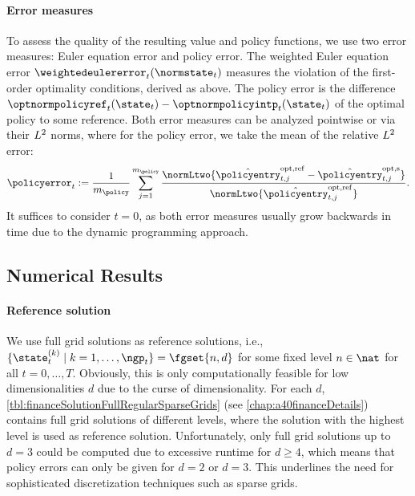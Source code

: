 \paragraph{Error measures}

To assess the quality of the resulting value and policy functions,
we use two error measures:
Euler equation error and policy error.
The weighted Euler equation error $\weightedeulererror_t(\normstate_t)$
measures the violation of the first-order optimality conditions,
derived as above.
The policy error is the difference
$\optnormpolicyref_t(\state_t) - \optnormpolicyintp_t(\state_t)$
of the optimal policy to some reference.
Both error measures can be analyzed pointwise or
via their $L^2$ norms, where for the policy error,
we take the mean of the relative $L^2$ error:
\begin{equation}
  \policyerror_t
  := \frac{1}{m_{\policy}} \sum_{j=1}^{m_{\policy}}
  \frac{
    \normLtwo{\optnormpolicyentryref_{t,j} - \optnormpolicyentryintp_{t,j}}
  }{
    \normLtwo{\optnormpolicyentryref_{t,j}}
  }.
\end{equation}
It suffices to consider $t = 0$, as both error measures
usually grow backwards in time due to the dynamic programming approach.



\subsection{Numerical Results}
\label{sec:842results}

\paragraph{Reference solution}

We use full grid solutions as reference solutions,
i.e., $\{\state_t^{(k)} \mid k = 1, \dotsc, \ngp_t\} = \fgset{n,d}$
for some fixed level $n \in \nat$ for all $t = 0, \dotsc, T$.
Obviously, this is only computationally feasible
for low dimensionalities $d$ due to the curse of dimensionality.
For each $d$,
\cref{tbl:financeSolutionFullRegularSparseGrids}
(see \cref{chap:a40financeDetails})
contains full grid solutions of different levels,
where the solution with the highest level is used as reference solution.
Unfortunately, only full grid solutions up to $d = 3$ could be computed
due to excessive runtime for $d \ge 4$,
which means that policy errors can only be given for $d = 2$ or $d = 3$.
This underlines the need for sophisticated
discretization techniques such as sparse grids.

